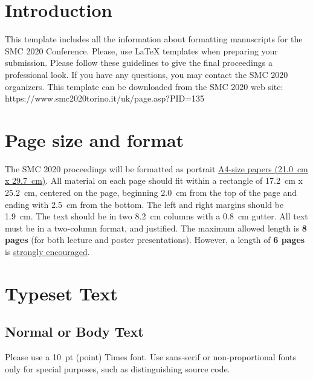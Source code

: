 \documentclass{article}
\title{\papertitle}
\begin{document}
%
\capstartfalse
\maketitle
\capstarttrue
%
\begin{abstract}

\end{abstract}
%

\section{Introduction}\label{sec:introduction}
This template includes all the information about formatting manuscripts for
the SMC 2020 Conference.
Please, use \LaTeX{} templates when
preparing your submission.
Please follow these guidelines to give the final proceedings a professional look.
If you have any questions, you may contact the SMC 2020 organizers.
This template can be downloaded from the SMC 2020 web site:\\
https://www.smc2020torino.it/uk/page.asp?PID=135

\section{Page size and format}
\label{sec:page_size}
The SMC 2020 proceedings will be formatted as portrait \underline{A4-size papers (21.0~cm x 29.7~cm)}. All material on each page should fit within a rectangle of 17.2~cm x 25.2~cm, centered on the page, beginning 2.0~cm from the top of the page and ending with 2.5~cm from the bottom. The left and right margins should be 1.9~cm. The text should be in two 8.2~cm columns with a 0.8~cm gutter. All text must be in a two-column format, and justified.
The maximum allowed length is {\bf8 pages} (for both lecture and poster presentations). However, a length of {\bf6 pages} is \underline{strongly encouraged}.


\section{Typeset Text}\label{sec:typeset_text}

\subsection{Normal or Body Text}
\label{subsec:body}
Please use a 10~pt (point) Times font. Use sans-serif or non-proportional fonts only for special purposes, such as distinguishing source code.
\end{document}

